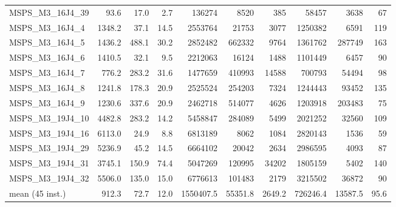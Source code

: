 \documentclass[a4paper,10pt]{article}
\theoremstyle{definition}
\begin{document}
\begin{table}[t]
\begin{scriptsize}
\begin{tabular*}{\textwidth}{@{}l@{\;\;\extracolsep{\fill}}rrrrrrrrr@{}}
MSPS\_M3\_16J4\_39 & \num{  93.6} & \num{  17.0} & \num{   2.7} & \num{    136274} & \num{      8520} & \num{       385} & \num{     58457} & \num{      3638} & \num{        67}\\
 MSPS\_M3\_16J4\_4 & \num{1348.2} & \num{  37.1} & \num{  14.5} & \num{   2553764} & \num{     21753} & \num{      3077} & \num{   1250382} & \num{      6591} & \num{       119}\\
 MSPS\_M3\_16J4\_5 & \num{1436.2} & \num{ 488.1} & \num{  30.2} & \num{   2852482} & \num{    662332} & \num{      9764} & \num{   1361762} & \num{    287749} & \num{       163}\\
 MSPS\_M3\_16J4\_6 & \num{1410.5} & \num{  32.1} & \num{   9.5} & \num{   2212063} & \num{     16124} & \num{      1488} & \num{   1101449} & \num{      6457} & \num{        90}\\
 MSPS\_M3\_16J4\_7 & \num{ 776.2} & \num{ 283.2} & \num{  31.6} & \num{   1477659} & \num{    410993} & \num{     14588} & \num{    700793} & \num{     54494} & \num{        98}\\
 MSPS\_M3\_16J4\_8 & \num{1241.8} & \num{ 178.3} & \num{  20.9} & \num{   2525524} & \num{    254203} & \num{      7324} & \num{   1244443} & \num{     93452} & \num{       135}\\
 MSPS\_M3\_16J4\_9 & \num{1230.6} & \num{ 337.6} & \num{  20.9} & \num{   2462718} & \num{    514077} & \num{      4626} & \num{   1203918} & \num{    203483} & \num{        75}\\
MSPS\_M3\_19J4\_10 & \num{4482.8} & \num{ 283.2} & \num{  14.2} & \num{   5458847} & \num{    284089} & \num{      5499} & \num{   2021252} & \num{     32560} & \num{       109}\\
MSPS\_M3\_19J4\_16 & \num{6113.0} & \num{  24.9} & \num{   8.8} & \num{   6813189} & \num{      8062} & \num{      1084} & \num{   2820143} & \num{      1536} & \num{        59}\\
MSPS\_M3\_19J4\_29 & \num{5236.9} & \num{  45.2} & \num{  14.5} & \num{   6664102} & \num{     20042} & \num{      2634} & \num{   2986595} & \num{      4093} & \num{        87}\\
MSPS\_M3\_19J4\_31 & \num{3745.1} & \num{ 150.9} & \num{  74.4} & \num{   5047269} & \num{    120995} & \num{     34202} & \num{   1805159} & \num{      5402} & \num{       140}\\
MSPS\_M3\_19J4\_32 & \num{5506.0} & \num{ 135.0} & \num{  15.0} & \num{   6776613} & \num{    101483} & \num{      2179} & \num{   3215502} & \num{     36872} & \num{        90}\\
\midrule
mean (45 inst.) & \num{ 912.3} & \num{  72.7} & \num{  12.0} & \num{ 1550407.5} & \num{   55351.8} & \num{    2649.2} & \num{  726246.4} & \num{   13587.5} & \num{      95.6}\\
    \bottomrule
  \end{tabular*}
  \end{scriptsize}
\end{table}

%
\end{document}
